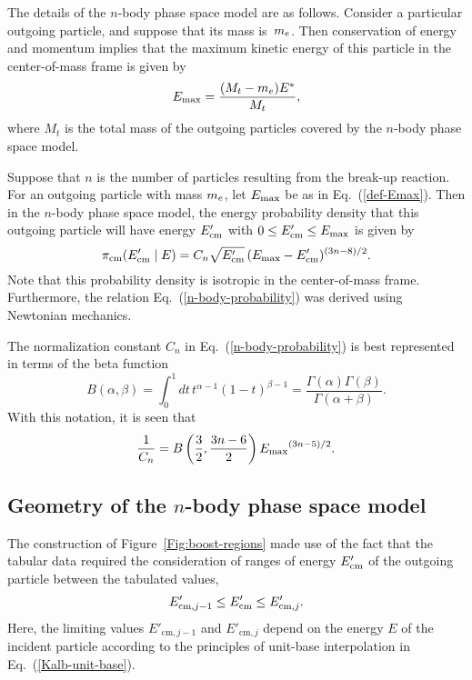 The details of the $n$-body phase space model are as follows.
Consider a particular outgoing particle, and suppose that its mass is~$m_e$.
Then conservation of energy and
momentum implies that the maximum kinetic energy of this particle
in the center-of-mass frame is given by
\begin{equation}
  E_{\text{max}} = \frac{(M_t - m_e) {E^*}}{M_t},
  \label{def-Emax}
\end{equation}
where $M_t$ is the total mass of the outgoing particles covered by
the $n$-body phase space model.

Suppose that $n$ is the number of particles resulting from the break-up
reaction.  For an outgoing particle with mass $m_e$,
let $E_{\text{max}}$ be as in Eq.~(\ref{def-Emax}).
Then in the $n$-body phase space model, the energy probability density 
that this outgoing particle will have energy $E_{\text{cm}}'$ with $0 \le E_{\text{cm}}' \le E_{\text{max}}$
is given by
\begin{equation}
  \pi_{\text{cm}}(E_{\text{cm}}' \mid E ) = C_n 
     \sqrt{E_{\text{cm}}'}\,
     (E_{\text{max}} - E_{\text{cm}}')^{(3n - 8)/2}.
  \label{n-body-probability}
\end{equation}
Note that this probability density is isotropic in the center-of-mass frame.
Furthermore, the relation Eq.~(\ref{n-body-probability}) was derived using Newtonian
mechanics.

The normalization constant $C_n$ in Eq.~(\ref{n-body-probability}) is best
represented in terms of the beta function
\begin{equation}
  B(\alpha, \beta) =
   \int_0^1 dt \, t^{\alpha - 1} (1 - t)^{\beta - 1} =
   \frac{\Gamma(\alpha) \Gamma(\beta)}{\Gamma( \alpha + \beta)}.
  \label{beta-func}
\end{equation}
With this notation, it is seen that
\begin{equation}
  \frac{1}{C_n} = B\left(\frac{3}{2}, \frac{3n - 6}{2} \right)
    {E_{\text{max}}}^{(3n - 5)/2}.
  \label{norm}
\end{equation}

\subsection{Geometry of the $n$-body phase space model}
The construction of Figure~\ref{Fig:boost-regions}
made use of the fact that the tabular data required the
consideration of ranges of energy $E_{\text{cm}}'$ of the outgoing particle
between the tabulated values,
\begin{equation}
  E'_{\text{cm},j-1} \le E_{\text{cm}}' \le E'_{\text{cm},j}.
  \label{KalbachEcm}
\end{equation}
Here, the limiting values $E'_{\text{cm},j-1}$ and $E'_{\text{cm},j}$
depend on the energy $E$ of the incident particle according to the
principles of unit-base interpolation in Eq.~(\ref{Kalb-unit-base}).

